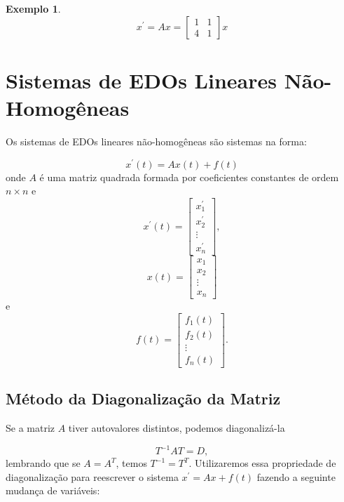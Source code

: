 \documentclass[a4paper,portuguese,9pt,final]{extarticle}
\newtheorem{example}{Exemplo}[section]
\begin{document}
\begin{multicols*}{2}
\begin{example}
            
            \begin{equation*}
                x^\prime = Ax = \begin{bmatrix}
                                     1 & 1\\
                                     4 & 1
                                     \end{bmatrix} x 
            \end{equation*}
            
        \end{example}
        
    \section{Sistemas de EDOs Lineares Não-Homogêneas}
    
        Os sistemas de EDOs lineares não-homogêneas são sistemas na forma:
        
        \begin{equation*}
                x^\prime (t) = Ax(t) + f(t)
            \end{equation*}
        onde $A$ é uma matriz quadrada formada por coeficientes constantes de ordem $n \times n$ e $$ x^\prime (t) = \begin{bmatrix}
x_1^\prime\\
x_2^\prime\\
\vdots\\
x_n^\prime
\end{bmatrix},$$ $$ x(t) = \begin{bmatrix}
x_1 \\
x_2 \\
\vdots\\
x_n 
\end{bmatrix}$$ e $$ f(t) = \begin{bmatrix}
f_1 (t) \\
f_2 (t) \\
\vdots\\
f_n (t) 
\end{bmatrix}.$$

        \subsection{Método da Diagonalização da Matriz}
        
        Se a matriz $A$ tiver autovalores distintos,  podemos diagonalizá-la 
        
        \begin{equation*}
            T^{-1}AT=D,
        \end{equation*}
        lembrando que se $A=A^T$, temos $T^{-1} = T^T$. Utilizaremos essa propriedade de diagonalização para reescrever o sistema $x^\prime = Ax + f(t)$ fazendo a seguinte mudança de variáveis:
        

\end{multicols*}
\end{document}
